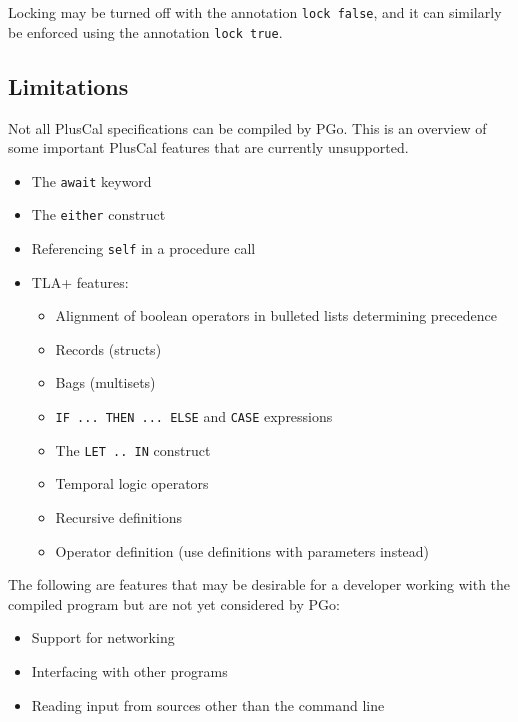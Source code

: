Locking may be turned off with the annotation \texttt{lock false}, and it can similarly be enforced using the annotation \texttt{lock true}.

\subsection{Limitations}
Not all PlusCal specifications can be compiled by PGo. This is an overview of some important PlusCal features that are currently unsupported.

\begin{itemize}
\item The \texttt{await} keyword

\item The \texttt{either} construct

\item Referencing \texttt{self} in a procedure call

\item TLA+ features:

	\begin{itemize}
	\item Alignment of boolean operators in bulleted lists determining precedence
	
	\item Records (structs)
	
	\item Bags (multisets)
	
	\item \texttt{IF ... THEN ... ELSE} and \texttt{CASE} expressions
	
	\item The \texttt{LET .. IN} construct
	
	\item Temporal logic operators
	
	\item Recursive definitions
	
	\item Operator definition (use definitions with parameters instead)
	\end{itemize}
\end{itemize}

The following are features that may be desirable for a developer working with the compiled program but are not yet considered by PGo:

\begin{itemize}
\item Support for networking

\item Interfacing with other programs

\item Reading input from sources other than the command line
\end{itemize}
